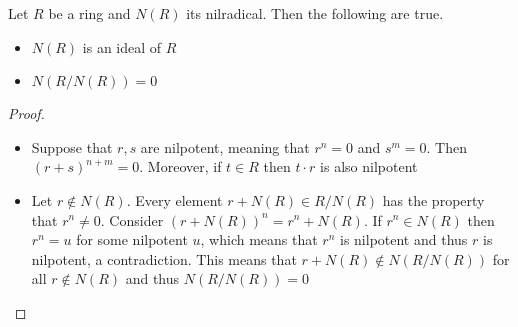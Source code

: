 \documentclass[a4paper]{article}
\begin{document}
\begin{prp}{}{} Let $R$ be a ring and $N(R)$ its nilradical. Then the following are true. 
\begin{itemize}
\item $N(R)$ is an ideal of $R$
\item $N(R/N(R))=0$
\end{itemize}\tcbline
\begin{proof}~\\
\begin{itemize}
\item Suppose that $r,s$ are nilpotent, meaning that $r^n=0$ and $s^m=0$. Then $(r+s)^{n+m}=0$. Moreover, if $t\in R$ then $t\cdot r$ is also nilpotent
\item Let $r\notin N(R)$. Every element $r+N(R)\in R/N(R)$ has the property that $r^n\neq 0$. Consider $(r+N(R))^n=r^n+N(R)$. If $r^n\in N(R)$ then $r^n=u$ for some nilpotent $u$, which means that $r^n$ is nilpotent and thus $r$ is nilpotent, a contradiction. This means that $r+N(R)\notin N(R/N(R))$ for all $r\notin N(R)$ and thus $N(R/N(R))=0$
\end{itemize}
\end{proof}
\end{prp}
\end{document}

